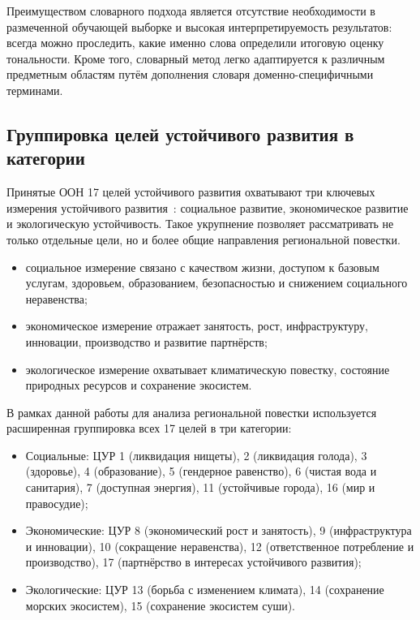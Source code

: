 \documentclass[master, och, coursework]{SCWorks1}
\begin{document}
Преимуществом словарного подхода является отсутствие необходимости в размеченной обучающей выборке и высокая интерпретируемость результатов: всегда можно проследить, какие именно слова определили итоговую оценку тональности. Кроме того, словарный метод легко адаптируется к различным предметным областям путём дополнения словаря доменно-специфичными терминами.

	\subsection{Группировка целей устойчивого развития в категории}
	
Принятые ООН 17 целей устойчивого развития охватывают три ключевых измерения устойчивого развития~\cite{UN2015}: социальное развитие, экономическое развитие и экологическую устойчивость. Такое укрупнение позволяет рассматривать не только отдельные цели, но и более общие направления региональной повестки.

\begin{itemize}
	\item социальное измерение связано с качеством жизни, доступом к базовым услугам, здоровьем, образованием, безопасностью и снижением социального неравенства;
	\item экономическое измерение отражает занятость, рост, инфраструктуру, инновации, производство и развитие партнёрств;
	\item экологическое измерение охватывает климатическую повестку, состояние природных ресурсов и сохранение экосистем.
\end{itemize}

В рамках данной работы для анализа региональной повестки используется расширенная группировка всех 17 целей в три категории:

\begin{itemize}
	\item Социальные: ЦУР 1 (ликвидация нищеты), 2 (ликвидация голода), 3 (здоровье), 4 (образование), 5 (гендерное равенство), 6 (чистая вода и санитария), 7 (доступная энергия), 11 (устойчивые города), 16 (мир и правосудие);
	\item Экономические: ЦУР 8 (экономический рост и занятость), 9 (инфраструктура и инновации), 10 (сокращение неравенства), 12 (ответственное потребление и производство), 17 (партнёрство в интересах устойчивого развития);
	\item Экологические: ЦУР 13 (борьба с изменением климата), 14 (сохранение морских экосистем), 15 (сохранение экосистем суши).
\end{itemize}
\end{document}
